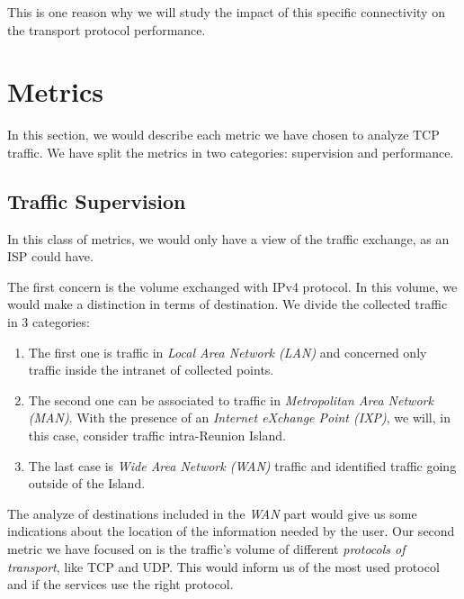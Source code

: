 \documentclass[10pt, conference, a4paper, twocolumns]{IEEEtran}
\def\rouge#1{\textcolor{red}{#1}}
\def\yassine#1{\textbf{\textcolor{blue}{yassine : #1}}}
\begin{document}
This is one reason why we will study the impact of this specific %
connectivity on the transport protocol performance.

\section{Metrics}
\label{sec:metrics}
In this section, we would describe each metric we have chosen to analyze TCP traffic. We have split the metrics in two categories: supervision and performance.

\subsection{Traffic Supervision}
\label{subsec:supervision}
In this class of metrics, we would only have a view of the traffic exchange, as an ISP could have. %

The first concern is the volume exchanged with IPv4 protocol. %
In this volume, we would make a distinction in terms of destination. We divide the collected traffic in 3 categories:
\begin {enumerate}
\item The first one is traffic in \emph{Local Area Network (LAN)} and concerned only traffic inside the intranet of collected points.
\item The second one can be associated to traffic in \emph{Metropolitan Area Network (MAN)}. With the presence of an \emph{Internet eXchange Point (IXP)}, we will, in this case, consider traffic intra-Reunion Island.
\item The last case is \emph{Wide Area Network (WAN)} traffic and identified traffic going outside of the Island. 
\end{enumerate}
The analyze of destinations included in the \emph{WAN} part would give us some indications about the location of the information needed by the user.
Our second metric we have focused on is the traffic's volume of different \textit{protocols of transport}, like TCP and UDP. This would inform us of the most used protocol and if the services use the right protocol.
\end{document}
